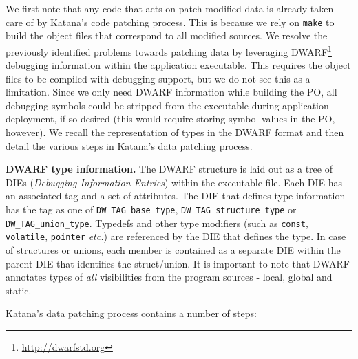 We first note that any code that acts on patch-modified data is
already taken care of by Katana's code patching process. This is
because we rely on {\tt make} to build the object files that
correspond to all modified sources. We resolve the previously
identified problems towards patching data by leveraging
DWARF\footnote{\url{http://dwarfstd.org}} debugging information within the
application executable. This requires the object files to be compiled
with debugging support, but we do not see this as a limitation. Since
we only need DWARF information while building the PO, all debugging
symbols could be stripped from the executable during application
deployment, if so desired 
(this would require storing symbol values in the PO, however).
We recall the representation of types in
the DWARF format and then detail the various steps in Katana's data
patching process.

{\bf DWARF type information.} %
The DWARF structure is laid
out as a tree of DIEs ({\it Debugging Information Entries}) within the
executable file. Each DIE has an associated tag and a set of
attributes. The DIE that defines type information has the tag as one
of {\tt DW\_TAG\_base\_type}, {\tt DW\_TAG\_structure\_type} or {\tt
  DW\_TAG\_union\_type}. Typedefs and other type modifiers (such as
{\tt const}, {\tt volatile}, {\tt pointer} {\it etc.}) are referenced
by the DIE that defines the type. In case of structures or unions,
each member is contained as a separate DIE within the parent DIE that
identifies the struct/union. It is important to note that DWARF
annotates types of {\it all} visibilities from the program sources -
local, global and static.

Katana's data patching process contains a number of steps:

